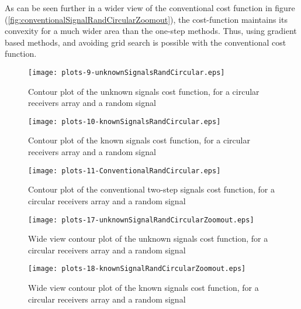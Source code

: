 As can be seen further in a wider view of the conventional cost function in figure (\ref{fig:conventionalSignalRandCircularZoomout}), the cost-function maintains its convexity for a much wider area than the one-step methods.
Thus, using gradient based methods, and avoiding grid search is possible with the conventional cost function.

\begin{figure}
\begin{center}
\texttt{[image: plots-9-unknownSignalsRandCircular.eps]} 
\end{center}
\caption{Contour plot of the unknown signals cost function, for a circular receivers array and a random signal}
\label{fig:unknownSignalsRandCircular}
\end{figure}

\begin{figure}
\begin{center}
\texttt{[image: plots-10-knownSignalsRandCircular.eps]} 
\end{center}
\caption{Contour plot of the known signals cost function, for a circular receivers array and a random signal}
\label{fig:knownSignalsRandCircular}
\end{figure}

\begin{figure}
\begin{center}
\texttt{[image: plots-11-ConventionalRandCircular.eps]} 
\end{center}
\caption{Contour plot of the conventional two-step signals cost function, for a circular receivers array and a random signal}
\label{fig:conventionalRandCircular}
\end{figure}

\begin{figure}
\begin{center}
\texttt{[image: plots-17-unknownSignalRandCircularZoomout.eps]} 
\end{center}
\caption{Wide view contour plot of the unknown signals cost function, for a circular receivers array and a random signal}
\label{fig:unknownSignalRandCircularZoomout}
\end{figure}

\begin{figure}
\begin{center}
\texttt{[image: plots-18-knownSignalRandCircularZoomout.eps]} 
\end{center}
\caption{Wide view contour plot of the known signals cost function, for a circular receivers array and a random signal}
\label{fig:knownSignalRandCircularZoomout}
\end{figure}

